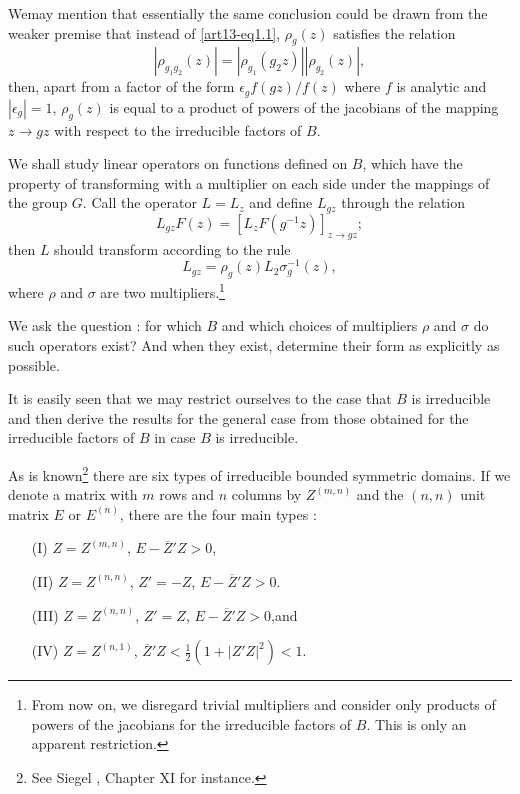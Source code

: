 We\pageoriginale may mention that essentially the same conclusion could be drawn from the weaker premise that instead of \eqref{art13-eq1.1}, $\rho_{g}(z)$ satisfies the relation 
\begin{equation}
|\rho_{g_{1}g_{2}}(z)|=|\rho_{g_{1}}(g_{2}z)||\rho_{g_{2}}(z)|,
\end{equation}
then, apart from a factor of the form $\epsilon_{g}f(gz)/f(z)$ where $f$ is analytic and $|\epsilon_{g}|=1$, $\rho_{g}(z)$ is equal to a product of powers of the jacobians of the mapping $z\to gz$ with respect to the irreducible factors of $B$.

We shall study linear operators on functions defined on $B$, which have the property of transforming with a multiplier on each side under the mappings of the group $G$. Call the operator $L=L_{z}$ and define $L_{gz}$ through the relation
$$
L_{gz}F(z)=[L_{z}F(g^{-1}z)]_{z\to gz};
$$
then $L$ should transform according to the rule
\begin{equation}
L_{gz}=\rho_{g}(z)L_{2}\sigma^{-1}_{g}(z),\label{art13-eq1.4}
\end{equation}
where $\rho$ and $\sigma$ are two multipliers.\footnote{From now on, we disregard trivial multipliers and consider only products of powers of the jacobians for the irreducible factors of $B$. This is only an apparent restriction.}

We ask the question : for which $B$ and which choices of multipliers $\rho$ and $\sigma$ do such operators exist? And when they exist, determine their form as explicitly as possible.

It is easily seen that we may restrict ourselves to the case that $B$ is irreducible and then derive the results for the general case from those obtained for the irreducible factors of $B$ in case $B$ is irreducible.

As is known\footnote{See Siegel \cite{art13-key5}, Chapter XI for instance.} there are six types of irreducible bounded symmetric domains. If we denote a matrix with $m$ rows and $n$ columns by $Z^{(m,n)}$ and the $(n,n)$ unit matrix $E$ or $E^{(n)}$, there are the four main types :
\begin{itemize}
\item[(I)] $Z=Z^{(m,n)}$, $E-\overline{Z}'Z>0$,

\item[(II)] $Z=Z^{(n,n)}$, $Z'=-Z$, $E-\overline{Z}'Z>0$.

\item[(III)] $Z=Z^{(n,n)}$, $Z'=Z$, $E-\overline{Z}'Z>0$,\quad and

\item[(IV)] $Z=Z^{(n,1)}$, $\overline{Z}'Z<\frac{1}{2}(1+|Z'Z|^{2})<1$.
\end{itemize}

